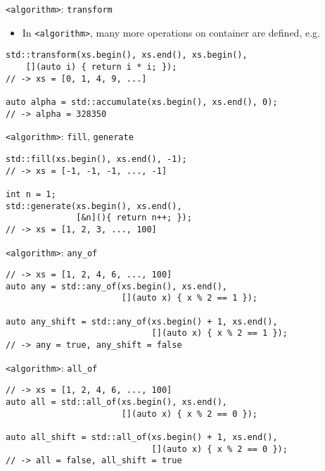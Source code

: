 \documentclass[10pt]{beamer}
\begin{document}
\begin{frame}[fragile,label={sec:orga496a6f}]{\texttt{<algorithm>}: \texttt{transform}}
 \begin{itemize}
\item In \texttt{<algorithm>}, many more operations on container are defined, e.g.
\end{itemize}

\begin{verbatim}
std::transform(xs.begin(), xs.end(), xs.begin(),
    [](auto i) { return i * i; });
// -> xs = [0, 1, 4, 9, ...]

auto alpha = std::accumulate(xs.begin(), xs.end(), 0);
// -> alpha = 328350
\end{verbatim}
\end{frame}

\begin{frame}[fragile,label={sec:org13f3d10}]{\texttt{<algorithm>}: \texttt{fill}, \texttt{generate}}
 \begin{verbatim}
std::fill(xs.begin(), xs.end(), -1);
// -> xs = [-1, -1, -1, ..., -1]

int n = 1;
std::generate(xs.begin(), xs.end(),
              [&n](){ return n++; });
// -> xs = [1, 2, 3, ..., 100]
\end{verbatim}
\end{frame}

\begin{frame}[fragile,label={sec:orge5658ed}]{\texttt{<algorithm>}: \texttt{any\_of}}
 \begin{verbatim}
// -> xs = [1, 2, 4, 6, ..., 100]
auto any = std::any_of(xs.begin(), xs.end(),
                       [](auto x) { x % 2 == 1 });

auto any_shift = std::any_of(xs.begin() + 1, xs.end(),
                             [](auto x) { x % 2 == 1 });
// -> any = true, any_shift = false
\end{verbatim}
\end{frame}


\begin{frame}[fragile,label={sec:org9209f80}]{\texttt{<algorithm>}: \texttt{all\_of}}
 \begin{verbatim}
// -> xs = [1, 2, 4, 6, ..., 100]
auto all = std::all_of(xs.begin(), xs.end(),
                       [](auto x) { x % 2 == 0 });

auto all_shift = std::all_of(xs.begin() + 1, xs.end(),
                             [](auto x) { x % 2 == 0 });
// -> all = false, all_shift = true
\end{verbatim}
\end{frame}
\end{document}
